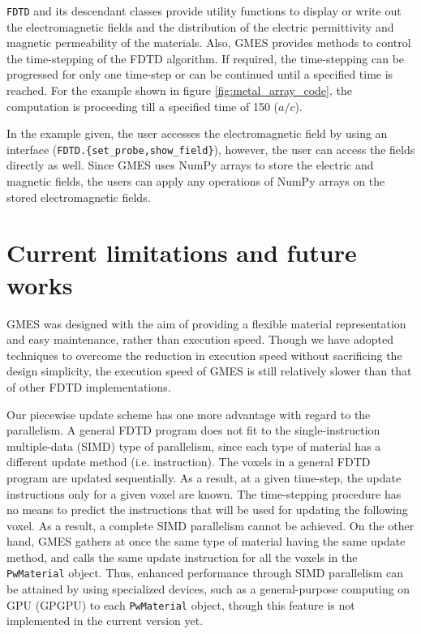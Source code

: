 \texttt{FDTD} and its descendant classes provide utility functions to display or write out the electromagnetic fields and the distribution of the electric permittivity and magnetic permeability of the materials. Also, GMES provides methods to control the time-stepping of the FDTD algorithm. If required, the time-stepping can be progressed for only one time-step or can be continued until a specified time is reached. For the example shown in figure \ref{fig:metal_array_code}, the computation is proceeding till a specified time of 150 ($a/c$).

In the example given, the user accesses the electromagnetic field by using an interface (\texttt{FDTD.\{set\_probe,show\_field\}}), however, the user can access the fields directly as well. Since GMES uses NumPy arrays to store the electric and magnetic fields, the users can apply any operations of NumPy arrays \cite{oliphant_guide_2006} on the stored electromagnetic fields.

\section{Current limitations and future works}
\label{sec:limitation}
GMES was designed with the aim of providing a flexible material representation and easy maintenance, rather than execution speed. Though we have adopted techniques to overcome the reduction in execution speed without sacrificing the design simplicity, the execution speed of GMES is still relatively slower than that of other FDTD implementations.

Our piecewise update scheme has one more advantage with regard to the parallelism. A general FDTD program does not fit to the single-instruction multiple-data (SIMD) type of parallelism, since each type of material has a different update method (i.e. instruction). The voxels in a general FDTD program are updated sequentially. As a result, at a given time-step, the update instructions only for a given voxel are known. The time-stepping procedure has no means to predict the instructions that will be used for updating the following voxel. As a result, a complete SIMD parallelism cannot be achieved. On the other hand, GMES gathers at once the same type of material having the same update method, and calls the same update instruction for all the voxels in the \texttt{PwMaterial} object. Thus, enhanced performance through SIMD parallelism can be attained by using specialized devices, such as a general-purpose computing on GPU (GPGPU) to each \texttt{PwMaterial} object, though this feature is not implemented in the current version yet.

